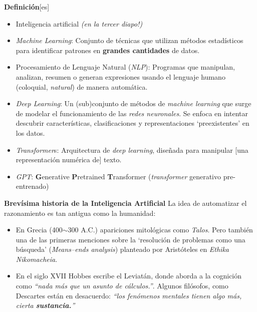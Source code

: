 \documentclass{beamer}
\begin{document}
\begin{frame}{{\bfseries Definición}[es]}
\vspace{-5mm}
\begin{itemize}
    \item<1-> Inteligencia artificial {\color{grey}\textit{(en la tercer diapo!)}}
    \item<2-> \textit{Machine Learning}: Conjunto de técnicas que utilizan métodos estadísticos para identificar patrones en \textbf{grandes cantidades} de datos.
    \item<3-> Procesamiento de Lenguaje Natural (\textit{NLP}): Programas que manipulan, analizan, resumen o generan expresiones usando el lenguaje humano (coloquial, \textit{natural}) de manera automática.
    \item<4-> \textit{Deep Learning}: Un (sub)conjunto de métodos de \textit{machine learning} que surge de modelar el funcionamiento de las \textit{redes neuronales}. Se enfoca en intentar descubrir características, clasificaciones y representaciones `preexistentes' en los datos.
    \item<5-> \textit{Transformer}s: Arquitectura de \textit{deep learning}, diseñada para manipular {\color{grey}[una representación numérica de]} texto.
    \item<6-> \textit{GPT}: \textbf{G}enerative \textbf{P}retrained \textbf{T}ransformer (\textit{transformer} generativo pre-entrenado) 
\end{itemize}
\vspace{10mm}
\end{frame}


\begin{frame}{\bfseries Brevísima historia de la Inteligencia Artificial}
 La idea de automatizar el razonamiento es tan antigua como la humanidad:
\begin{itemize}
    \item En Grecia (400$\sim$300 A.C.) apariciones mitológicas como \textit{Talos}. Pero también una de las primeras menciones sobre la `resolución de problemas como una búsqueda' (\textit{Means–ends analysis}) planteado por Aristóteles en \textit{Ethika Nikomacheia}.
    \item En el siglo XVII Hobbes escribe el Leviatán, donde aborda a la cognición como \textit{``nada más que un asunto de cálculos.''}. Algunos filósofos, como Descartes están en desacuerdo: \textit{``los fenómenos mentales tienen algo más, cierta \textbf{sustancia.}''}
\end{itemize}
\end{frame}
\end{document}
